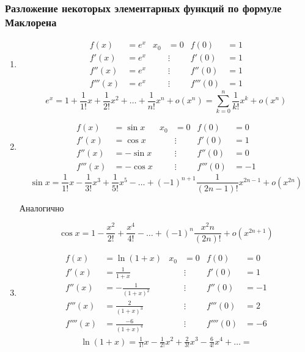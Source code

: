 \documentclass[12pt]{article}
\begin{document}
    \subsubsection*{Разложение некоторых элементарных функций по формуле Маклорена}
    \begin{enumerate}
        \item \begin{align*}
            f(x) &= e^x & x_0 &= 0 & f(0) &= 1\\
            f'(x) &= e^x & &\vdots & f'(0) &= 1\\
            f''(x) &= e^x & &\vdots & f''(0) &= 1\\
            f'''(x) &= e^x & &\vdots & f'''(0) &= 1
        \end{align*}
        \[ e^x = 1 + \frac{1}{1!}x + \frac{1}{2!}x^2 + \dots + \frac{1}{n!}x^n + o(x^n) = \sum_{k=0}^{n} \frac{1}{k!}x^k + o(x^n) \]
        \item \begin{align*}
            f(x) &= \sin x & x_0 &= 0 & f(0) &= 0\\
            f'(x) &= \cos x & &\vdots & f'(0) &= 1\\
            f''(x) &= -\sin x & &\vdots & f''(0) &= 0\\
            f'''(x) &= -\cos x & &\vdots & f'''(0) &= -1
        \end{align*}
        \[ \sin x = \frac{1}{1!}x - \frac{1}{3!}x^3 + \frac{1}{5!}x^5 - \dots + (-1)^{n+1}\frac{1}{(2n-1)!}x^{2n-1} + o(x^{2n}) \]
        \begin{center}
            Аналогично
        \end{center}
        \[ \cos x = 1 - \frac{x^2}{2!} + \frac{x^4}{4!} - \dots + (-1)^{n}\frac{x^2n}{(2n)!} + o(x^{2n+1}) \]
        \item \begin{align*}
            f(x) &= \ln (1 + x) & x_0 &= 0 & f(0) &= 0\\
            f'(x) &= \frac{1}{1+x} & &\vdots & f'(0) &= 1\\
            f''(x) &= -\frac{1}{(1+x)^2} & &\vdots & f''(0) &= -1\\
            f'''(x) &= \frac{2}{(1+x)^3} & &\vdots & f'''(0) &= 2\\
            f''''(x) &= \frac{-6}{(1+x)^4} & &\vdots & f''''(0) &= -6
        \end{align*}
        \begin{gather*}
            \ln(1+x) = \frac{1}{1!}x - \frac{1}{2!}x^2 + \frac{2}{3!}x^3 - \frac{6}{4!}x^4 + \dots =\\

\end{gather*}
\end{enumerate}
\end{document}
